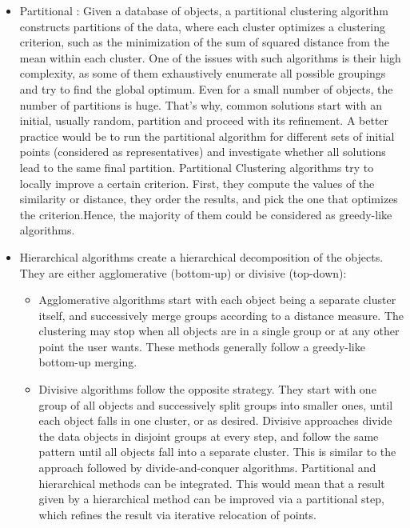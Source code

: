 \begin{itemize}
\item{Partitional : Given a database of objects, a partitional clustering algorithm constructs
partitions of the data, where each cluster optimizes a clustering criterion, such as the minimization of the sum of squared distance from the mean within each cluster.
One of the issues with such algorithms is their high complexity, as some of them exhaustively enumerate
all possible groupings and try to find the global optimum. Even for a small number of objects,
the number of partitions is huge. That’s why, common solutions start with an initial, usually
random, partition and proceed with its refinement. A better practice would be to run the partitional algorithm for different sets of initial points (considered as representatives) and investigate whether all solutions lead to the same final partition.
Partitional Clustering algorithms try to locally improve a certain criterion. First, they compute the
values of the similarity or distance, they order the results, and pick the one that optimizes the criterion.Hence, the majority of them could be considered as greedy-like algorithms.}

\item{Hierarchical algorithms create a hierarchical decomposition of the objects. They are either
agglomerative (bottom-up) or divisive (top-down):
\begin{itemize}
\item{Agglomerative algorithms start with each object being a separate cluster itself, and successively
merge groups according to a distance measure. The clustering may stop when all objects are in
a single group or at any other point the user wants.
These methods generally follow a greedy-like bottom-up merging.}
\item{Divisive algorithms follow the opposite strategy. They start with one group of all objects and
successively split groups into smaller ones, until each object falls in one cluster, or as desired.
Divisive approaches divide the data objects in disjoint groups at every step, and follow the same
pattern until all objects fall into a separate cluster. This is similar to the approach followed by
divide-and-conquer algorithms.
Partitional and hierarchical methods can be integrated. This would mean that a result given by a hierarchical
method can be improved via a partitional step, which refines the result via iterative relocation
of points.
}
\end{itemize}
}
\end{itemize}
